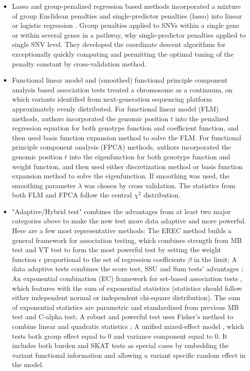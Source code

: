 \documentclass[12pt]{article}
\begin{document}
\begin{itemize}
\item Lasso and group-penalized regression based methods incorporated a mixture of group Euclidean penalties and single-predictor penalties (lasso) into linear or logistic regression \cite{Zhou2010,Kim2014}. Group penalties applied to SNVs within a single gene or within several genes in a pathway, why single-predictor penalties applied to single SNV level. They developed the coordinate descent algorithms for exceptionally quickly computing and
permitting the optimal tuning of the penalty constant by cross-validation method.
\item Functional linear model and (smoothed) functional principle component analysis based association tests \cite{Luo2011,Luo2012, Luo2012a,Fan2013} treated a chromosome as a continuum, on which variants identified from next-generation sequencing platform approximately evenly distributed. For functional linear model (FLM) methods, authors incorporated the genomic position $t$ into the penalized regression equation for both genotype function and coefficient function, and then used basis function expansion method to solve the FLM. For functional principle component analysis (FPCA) methods, authors incorporated the genomic position $t$ into the eigenfunction for both genotype function and weight function, and then used either discretization method or basis function expansion method to solve the eigenfunction. If smoothing was used, the smoothing parameter $\lambda$ was chosen by cross validation. The statistics from both FLM and FPCA follow the central $\chi^2$ distribution.
\item "Adaptive/Hybrid test" combines the advantages from at least two major categories above to make the new test more data adaptive and more powerful. Here are a few most representative methods: The EREC method \cite{Lin2011} builds a general framework for association testing, which combines strength from MB test and VT test to form the most powerful test by setting the weight function $\epsilon$ proportional to the set of regression coefficients $\beta$ in the limit; A data adaptive tests combines the score test, SSU and Sum tests' advantages \cite{Pan2011}; An exponential combination (EC) framework for set-based association tests \cite{Chen2012}, which features with the sum of exponential statistics (statistics should follow either independent normal or independent chi-square distribution). The sum of exponential statistics are parametric and standardized from previous MB test and C-alpha test; A robust and powerful test uses Fisher's method to combine linear and quadratic statistics \cite{Derkach2013}; A unified mixed-effect model \cite{Sun2013}, which tests both group effect equal to 0 and variance component equal to 0. It includes both burden and SKAT tests as special cases by embedding the variant functional information and allowing a variant specific random effect in the model.

\end{itemize}
\end{document}
